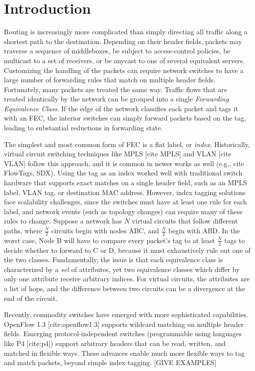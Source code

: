 \section{Introduction}
\label{sec:intro}
Routing is increasingly more complicated than simply directing all traffic along a shortest path to the destination.  Depending on their header fields, packets may traverse a sequence of middleboxes, be subject to access-control policies, be multicast to a set of receivers, or be anycast to one of several equivalent servers.  Customizing the handling of the packets can require network switches to have a large number of forwarding rules that match on multiple header fields.  Fortunately, many packets are treated the same way.  Traffic flows that are treated identically by the network can be grouped into a single \textit{Forwarding Equivalence Class}. If the edge of the network classifies each packet and tags it with an FEC, the interior switches can simply forward packets based on the tag, leading to substantial reductions in forwarding state.

The simplest and most common form of FEC is a flat label, or \emph{index}. Historically, virtual circuit switching techniques like MPLS [cite MPLS] and VLAN [cite VLAN] follow this approach, and it is common in newer works as well (e.g., cite FlowTags, SDX).  Using the tag as an index worked well with traditional switch hardware that supports exact matches on a single header field, such as an MPLS label, VLAN tag, or destination MAC address.  However, index tagging solutions face scalability challenges, since the switches must have at least one rule for each label, and network events (such as topology changes) can require many of these rules to change.  Suppose a network has $N$ virtual circuits that follow different paths, where
$\frac{N}{2}$ circuits begin with nodes ABC, and $\frac{N}{2}$ begin with ABD. In the worst case, Node B will have to compare every packet's tag to at least $\frac{N}{2}$ tags to decide whether to forward to C or D, because it must exhaustively rule out one of the two classes. Fundamentally, the issue is that each equivalence class is characterized by a \emph{set} of attributes, yet two equivalence classes which differ by only one attribute receive arbitrary indices. For virtual circuits, the attributes are a list of hops, and the difference between two circuits can be a divergence at the end of the circuit.

Recently, commodity switches have emerged with more sophisticated capabilities.  OpenFlow 1.3 [cite:openflow1.3] supports wildcard matching on multiple header fields. Emerging protocol-independent switches (programmable using languages like P4 [cite:p4]) support arbitrary headers that can be read, written, and matched in flexible ways.  These advances enable much more flexible ways to tag and match packets, beyond simple index tagging. [GIVE EXAMPLES]


